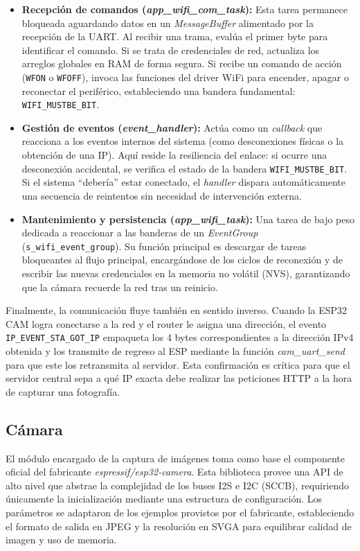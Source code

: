 \begin{itemize}
    \item \textbf{Recepción de comandos (\textit{app\_wifi\_com\_task}):} Esta tarea permanece bloqueada aguardando datos en un \textit{MessageBuffer} alimentado por la recepción de la UART. Al recibir una trama, evalúa el primer byte para identificar el comando. Si se trata de credenciales de red, actualiza los arreglos globales en RAM de forma segura. Si recibe un comando de acción (\texttt{WFON} o \texttt{WFOFF}), invoca las funciones del driver WiFi para encender, apagar o reconectar el periférico, estableciendo una bandera fundamental: \texttt{WIFI\_MUSTBE\_BIT}.
    
    \item \textbf{Gestión de eventos (\textit{event\_handler}):} Actúa como un \textit{callback} que reacciona a los eventos internos del sistema (como desconexiones físicas o la obtención de una IP). Aquí reside la resiliencia del enlace: si ocurre una desconexión accidental, se verifica el estado de la bandera \texttt{WIFI\_MUSTBE\_BIT}. Si el sistema \enquote{debería} estar conectado, el \textit{handler} dispara automáticamente una secuencia de reintentos sin necesidad de intervención externa.
    
    \item \textbf{Mantenimiento y persistencia (\textit{app\_wifi\_task}):} Una tarea de bajo peso dedicada a reaccionar a las banderas de un \textit{EventGroup} (\texttt{s\_wifi\_event\_group}). Su función principal es descargar de tareas bloqueantes al flujo principal, encargándose de los ciclos de reconexión y de escribir las nuevas credenciales en la memoria no volátil (NVS), garantizando que la cámara recuerde la red tras un reinicio.
\end{itemize}

Finalmente, la comunicación fluye también en sentido inverso. Cuando la ESP32 CAM logra conectarse a la red y el router le asigna una dirección, el evento \texttt{IP\_EVENT\_STA\_GOT\_IP} empaqueta los 4 bytes correspondientes a la dirección IPv4 obtenida y los transmite de regreso al ESP mediante la función \textit{cam\_uart\_send} para que este los retransmita al servidor. Esta confirmación es crítica para que el servidor central sepa a qué IP exacta debe realizar las peticiones HTTP a la hora de capturar una fotografía.


\subsection{Cámara}
El módulo encargado de la captura de imágenes toma como base el componente oficial del fabricante \textit{espressif/esp32-camera}. Esta biblioteca provee una API de alto nivel que abstrae la complejidad de los buses I2S e I2C (SCCB), requiriendo únicamente la inicialización mediante una estructura de configuración. Los parámetros se adaptaron de los ejemplos provistos por el fabricante, estableciendo el formato de salida en JPEG y la resolución en SVGA para equilibrar calidad de imagen y uso de memoria.


